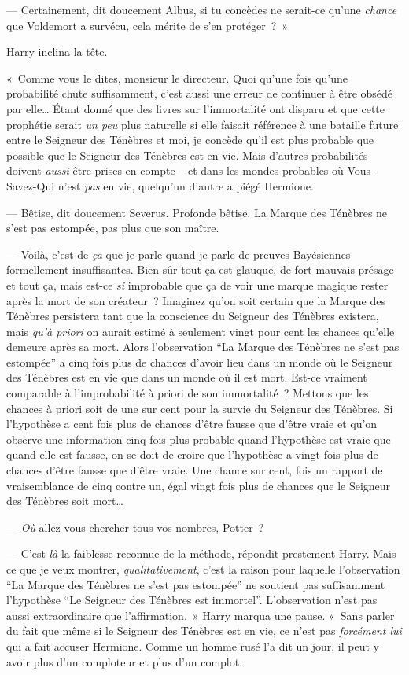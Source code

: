 --- Certainement, dit doucement Albus, si tu concèdes ne serait-ce qu'une \emph{chance} que Voldemort a survécu, cela mérite de s'en protéger~?~»

Harry inclina la tête.

«~Comme vous le dites, monsieur le directeur.
Quoi qu'une fois qu'une probabilité chute suffisamment, c'est aussi une erreur de continuer à être obsédé par elle…
Étant donné que des livres sur l'immortalité ont disparu et que cette prophétie serait \emph{un peu} plus naturelle si elle faisait référence à une bataille future entre le Seigneur des Ténèbres et moi, je concède qu'il est plus probable que possible que le Seigneur des Ténèbres est en vie.
Mais d'autres probabilités doivent \emph{aussi} être prises en compte -- et dans les mondes probables où Vous-Savez-Qui n'est \emph{pas} en vie, quelqu'un d'autre a piégé Hermione.

--- Bêtise, dit doucement Severus.
Profonde bêtise.
La Marque des Ténèbres ne s'est pas estompée, pas plus que son maître.

--- Voilà, c'est de \emph{ça} que je parle quand je parle de preuves Bayésiennes formellement insuffisantes.
Bien sûr tout ça est glauque, de fort mauvais présage et tout ça, mais est-ce \emph{si} improbable que ça de voir une marque magique rester après la mort de son créateur~?
Imaginez qu'on soit certain que la Marque des Ténèbres persistera tant que la conscience du Seigneur des Ténèbres existera, mais \emph{qu'à priori} on aurait estimé à seulement vingt pour cent les chances qu'elle demeure après sa mort.
Alors l'observation “La Marque des Ténèbres ne s'est pas estompée” a cinq fois plus de chances d'avoir lieu dans un monde où le Seigneur des Ténèbres est en vie que dans un monde où il est mort.
Est-ce vraiment comparable à l'improbabilité à priori de son immortalité~?
Mettons que les chances à priori soit de une sur cent pour la survie du Seigneur des Ténèbres.
Si l'hypothèse a cent fois plus de chances d'être fausse que d'être vraie et qu'on observe une information cinq fois plus probable quand l'hypothèse est vraie que quand elle est fausse, on se doit de croire que l'hypothèse a vingt fois plus de chances d'être fausse que d'être vraie.
Une chance sur cent, fois un rapport de vraisemblance de cinq contre un, égal vingt fois plus de chances que le Seigneur des Ténèbres soit mort…

--- \emph{Où} allez-vous chercher tous vos nombres, Potter~?

--- C'est \emph{là} la faiblesse reconnue de la méthode, répondit prestement Harry.
Mais ce que je veux montrer, \emph{qualitativement}, c'est la raison pour laquelle l'observation “La Marque des Ténèbres ne s'est pas estompée” ne soutient pas suffisamment l'hypothèse “Le Seigneur des Ténèbres est immortel”.
L'observation n'est pas aussi extraordinaire que l'affirmation.~»
Harry marqua une pause.
«~Sans parler du fait que même si le Seigneur des Ténèbres est en vie, ce n'est pas \emph{forcément lui} qui a fait accuser Hermione.
Comme un homme rusé l'a dit un jour, il peut y avoir plus d'un comploteur et plus d'un complot.


